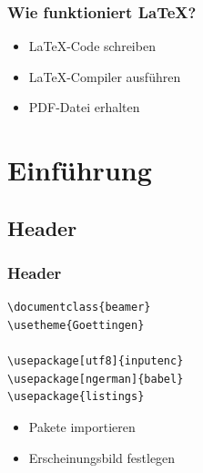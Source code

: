 \documentclass[aspectratio=169]{beamer}
\begin{document}
\begin{frame}
\frametitle{Wie funktioniert LaTeX?}

\begin{itemize}
\item LaTeX-Code schreiben
\item LaTeX-Compiler ausführen
\item PDF-Datei erhalten
\end{itemize}

\end{frame}



\section{Einführung}

\subsection{Header}
\begin{frame}[fragile]
\frametitle{Header}

\begin{lstlisting}[language={[latex]TeX}]
\documentclass{beamer}
\usetheme{Goettingen}

\usepackage[utf8]{inputenc}
\usepackage[ngerman]{babel}
\usepackage{listings}
\end{lstlisting}

\vspace{1em}

\begin{itemize}
  \item Pakete importieren
  \item Erscheinungsbild festlegen
\end{itemize}

\end{frame}

\end{document}
